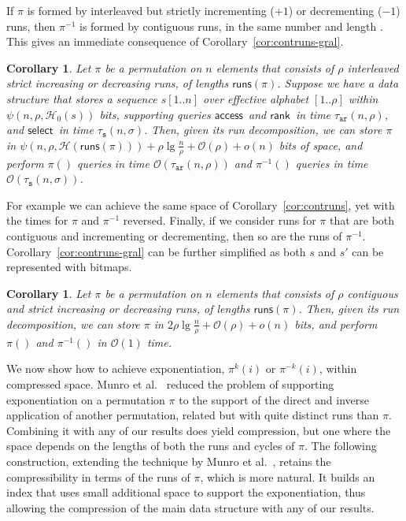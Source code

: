 \documentclass[11pt]{article}
\newtheorem{corollary}[theorem]{Corollary}
\providecommand{\pii}{\ensuremath{\pi^{-1}}}
\newcommand{\Oh}[1]
    {\ensuremath{\mathcal{O}\left( {#1} \right)}}
\newcommand{\access}
    {\ensuremath{\mathsf{access}}}
\newcommand{\rank}
    {\ensuremath{\mathsf{rank}}}
\newcommand{\select}
    {\ensuremath{\mathsf{select}}}
\newcommand{\runs}
    {\ensuremath{\mathsf{runs}}}
\newcommand{\HH}{\mathcal{H}}
\newcommand{\Ho}{\HH_0}
\begin{document}
\smallskip

If $\pi$ is formed by interleaved but strictly incrementing ($+1$) or 
decrementing ($-1$) runs, then $\pii$ is formed by contiguous runs,
in the same number and length \cite{BN09}. This gives an immediate 
consequence of Corollary~\ref{cor:contruns-gral}.

\begin{corollary} \label{cor:strict_runs}
  Let $\pi$ be a permutation on $n$ elements that consists of $\rho$
  interleaved strict increasing or decreasing runs, of lengths $\runs (\pi)$.
  Suppose we have a data structure that stores a sequence $s[1..n]$
  over effective alphabet $[1..\rho]$ within $\psi(n,\rho,\Ho(s))$ bits,
  supporting queries \access\ and \rank\ in time $\tau_\mathtt{ar}(n,\rho)$, 
  and \select\ in time $\tau_\mathtt{s}(n,\sigma)$.
Then, given its run decomposition, we can store $\pi$ in 
  $\psi(n,\rho,\HH(\runs(\pi))) + \rho\lg\frac{n}{\rho}+\Oh{\rho}+o(n)$ bits of 
  space, and perform $\pi()$ queries in time $\Oh{\tau_\mathtt{ar}(n,\rho)}$ 
  and $\pii()$ queries in time $\Oh{\tau_\mathtt{s}(n,\sigma)}$.
\end{corollary}

\smallskip

For example we can achieve the same space of Corollary~\ref{cor:contruns}, yet
with the times for $\pi$ and $\pii$ reversed.
Finally, if we consider runs for $\pi$ that are both contiguous and 
incrementing or decrementing, then  so are the runs of $\pii$.
Corollary~\ref{cor:contruns-gral} can be further simplified as both $s$ and $s'$
can be represented with bitmaps.

\begin{corollary} \label{cor:contstrictruns}
  Let $\pi$ be a permutation on $n$ elements that consists of $\rho$
  contiguous and strict increasing or decreasing runs, of lengths $\runs (\pi)$.
Then, given its run decomposition, we can store $\pi$ in 
  $2\rho\lg\frac{n}{\rho}+\Oh{\rho}+o(n)$ bits, and perform $\pi()$ 
  and $\pii()$ in $\Oh{1}$ time.
\end{corollary}

\smallskip

We now show how to achieve exponentiation, $\pi^k(i)$ or $\pi^{-k}(i)$,
within compressed space.
Munro et al.~\cite{MRRR03} reduced the problem of supporting
exponentiation on a permutation $\pi$ to the support of the direct and
inverse application of another permutation, related but with quite
distinct runs than $\pi$. Combining it with any of our results does yield 
compression, but one where the space depends on the lengths of both the 
runs and cycles of $\pi$.
The following construction, extending the technique by Munro et 
al.~\cite{MRRR03}, retains the compressibility in terms of the runs 
of $\pi$, which is more natural. 
It builds an index that uses small additional space to
support the exponentiation, thus allowing the compression of the main
data structure with any of our results.
\end{document}
